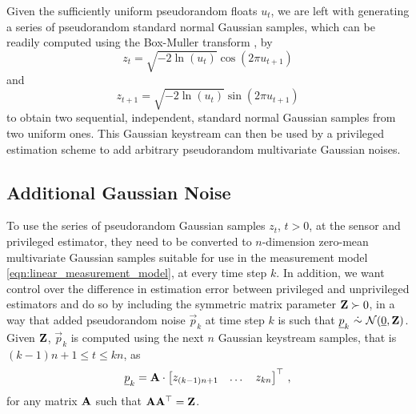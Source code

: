 \documentclass[letterpaper, 10 pt, conference]{ieeeconf}
\begin{document}
Given the sufficiently uniform pseudorandom floats $u_t$, we are left with generating a series of pseudorandom standard normal Gaussian samples, which can be readily computed using the Box-Muller transform \cite{paleyFourierTransformsComplex1934}, by
\begin{equation}
   z_t = \sqrt{-2\ln (u_t)}\cos(2\pi u_{t+1})
\end{equation}
and
\begin{equation}
   z_{t+1} = \sqrt{-2\ln (u_t)}\sin(2\pi u_{t+1})
\end{equation}
to obtain two sequential, independent, standard normal Gaussian samples from two uniform ones. This Gaussian keystream can then be used by a privileged estimation scheme to add arbitrary pseudorandom multivariate Gaussian noises.

% 
% 

\subsection{Additional Gaussian Noise}\label{subsec:adding_privilege_noise}
To use the series of pseudorandom Gaussian samples $z_t$, $t>0$, at the sensor and privileged estimator, they need to be converted to $n$-dimension zero-mean multivariate Gaussian samples suitable for use in the measurement model \eqref{eqn:linear_measurement_model}, at every time step $k$. In addition, we want control over the difference in estimation error between privileged and unprivileged estimators and do so by including the symmetric matrix parameter ${{\mathbf{Z}}}\succ 0$, in a way that added pseudorandom noise $\vec{p}_k$ at time step $k$ is such that $\vec{p}_k\ \dot{\sim}\ \mathcal{N}(\vec{0},\mat{Z})$. Given ${{\mathbf{Z}}}$, $\vec{p}_k$ is computed using the next $n$ Gaussian keystream samples, that is $(k-1)n+1\leq t\leq kn$, as
\begin{equation}
   {\underline{p}}_k = {{\mathbf{A}}}\cdot
   \begin{bmatrix}
      z_{(k-1)n+1} & \dots & z_{kn}
   \end{bmatrix}^\top\,,
\end{equation}
for any matrix ${{\mathbf{A}}}$ such that ${{\mathbf{A}}}{{\mathbf{A}}}^\top={{\mathbf{Z}}}$.
\end{document}
